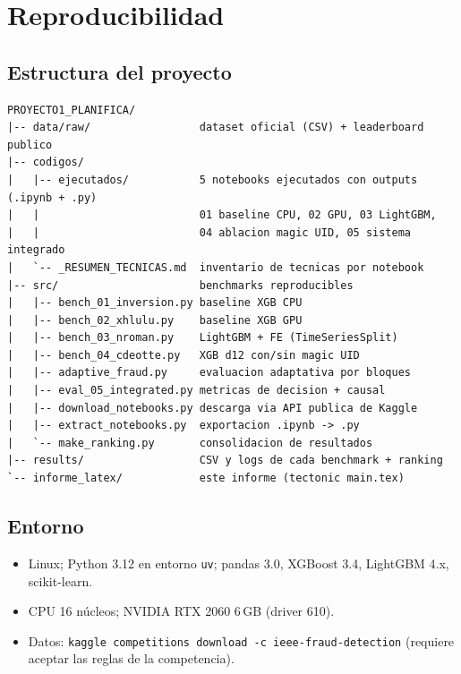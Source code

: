\chapter{Reproducibilidad}
\label{cap:apendice}

\section{Estructura del proyecto}

\begin{verbatim}
PROYECTO1_PLANIFICA/
|-- data/raw/                 dataset oficial (CSV) + leaderboard publico
|-- codigos/
|   |-- ejecutados/           5 notebooks ejecutados con outputs (.ipynb + .py)
|   |                         01 baseline CPU, 02 GPU, 03 LightGBM,
|   |                         04 ablacion magic UID, 05 sistema integrado
|   `-- _RESUMEN_TECNICAS.md  inventario de tecnicas por notebook
|-- src/                      benchmarks reproducibles
|   |-- bench_01_inversion.py baseline XGB CPU
|   |-- bench_02_xhlulu.py    baseline XGB GPU
|   |-- bench_03_nroman.py    LightGBM + FE (TimeSeriesSplit)
|   |-- bench_04_cdeotte.py   XGB d12 con/sin magic UID
|   |-- adaptive_fraud.py     evaluacion adaptativa por bloques
|   |-- eval_05_integrated.py metricas de decision + causal
|   |-- download_notebooks.py descarga via API publica de Kaggle
|   |-- extract_notebooks.py  exportacion .ipynb -> .py
|   `-- make_ranking.py       consolidacion de resultados
|-- results/                  CSV y logs de cada benchmark + ranking
`-- informe_latex/            este informe (tectonic main.tex)
\end{verbatim}

\section{Entorno}

\begin{sloppypar}
\begin{itemize}
  \item Linux; Python 3.12 en entorno \texttt{uv}; pandas 3.0, XGBoost 3.4,
        LightGBM 4.x, scikit-learn.
  \item CPU 16 núcleos; NVIDIA RTX 2060 6\,GB (driver 610).
  \item Datos: \texttt{kaggle competitions download -c ieee-fraud-detection}
        (requiere aceptar las reglas de la competencia).
\end{itemize}
\end{sloppypar}


